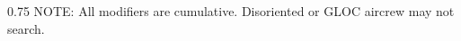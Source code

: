 \begin{twocolumntablefloat}[p]
\begin{twocolumntable}
\begin{tablenote}{0.75\linewidth}
NOTE: All modifiers are cumulative. Disoriented or GLOC aircrew may not search.
\end{tablenote}
\end{twocolumntable}
\end{twocolumntablefloat}

